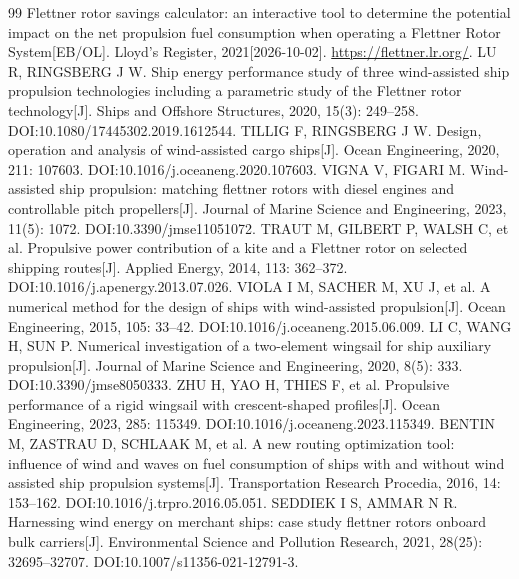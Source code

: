 \documentclass[UTF8,a4paper,twoside,zihao=5,fontset=windows]{ctexart}
\renewcommand{\baselinestretch}{1.35}
\begin{document}
\begingroup
\renewcommand{\refname}{参考文献}
\begin{thebibliography}{99}
\renewcommand{\baselinestretch}{1}\songti\fontsize{9pt}{16pt}\selectfont
\setlength{\itemsep}{0pt}\setlength{\parsep}{0pt}
Flettner rotor savings calculator: an interactive tool to determine the potential impact on the net propulsion fuel consumption when operating a Flettner Rotor System[EB/OL]. Lloyd's Register, 2021[2026-10-02]. \url{https://flettner.lr.org/}.
LU R, RINGSBERG J W. Ship energy performance study of three wind-assisted ship propulsion technologies including a parametric study of the Flettner rotor technology[J]. Ships and Offshore Structures, 2020, 15(3): 249--258. DOI:10.1080/17445302.2019.1612544.
TILLIG F, RINGSBERG J W. Design, operation and analysis of wind-assisted cargo ships[J]. Ocean Engineering, 2020, 211: 107603. DOI:10.1016/j.oceaneng.2020.107603.
VIGNA V, FIGARI M. Wind-assisted ship propulsion: matching flettner rotors with diesel engines and controllable pitch propellers[J]. Journal of Marine Science and Engineering, 2023, 11(5): 1072. DOI:10.3390/jmse11051072.
TRAUT M, GILBERT P, WALSH C, et al. Propulsive power contribution of a kite and a Flettner rotor on selected shipping routes[J]. Applied Energy, 2014, 113: 362--372. DOI:10.1016/j.apenergy.2013.07.026.
VIOLA I M, SACHER M, XU J, et al. A numerical method for the design of ships with wind-assisted propulsion[J]. Ocean Engineering, 2015, 105: 33--42. DOI:10.1016/j.oceaneng.2015.06.009.
LI C, WANG H, SUN P. Numerical investigation of a two-element wingsail for ship auxiliary propulsion[J]. Journal of Marine Science and Engineering, 2020, 8(5): 333. DOI:10.3390/jmse8050333.
ZHU H, YAO H, THIES F, et al. Propulsive performance of a rigid wingsail with crescent-shaped profiles[J]. Ocean Engineering, 2023, 285: 115349. DOI:10.1016/j.oceaneng.2023.115349.
BENTIN M, ZASTRAU D, SCHLAAK M, et al. A new routing optimization tool: influence of wind and waves on fuel consumption of ships with and without wind assisted ship propulsion systems[J]. Transportation Research Procedia, 2016, 14: 153--162. DOI:10.1016/j.trpro.2016.05.051.
SEDDIEK I S, AMMAR N R. Harnessing wind energy on merchant ships: case study flettner rotors onboard bulk carriers[J]. Environmental Science and Pollution Research, 2021, 28(25): 32695--32707. DOI:10.1007/s11356-021-12791-3.

\end{thebibliography}
\end{document}
